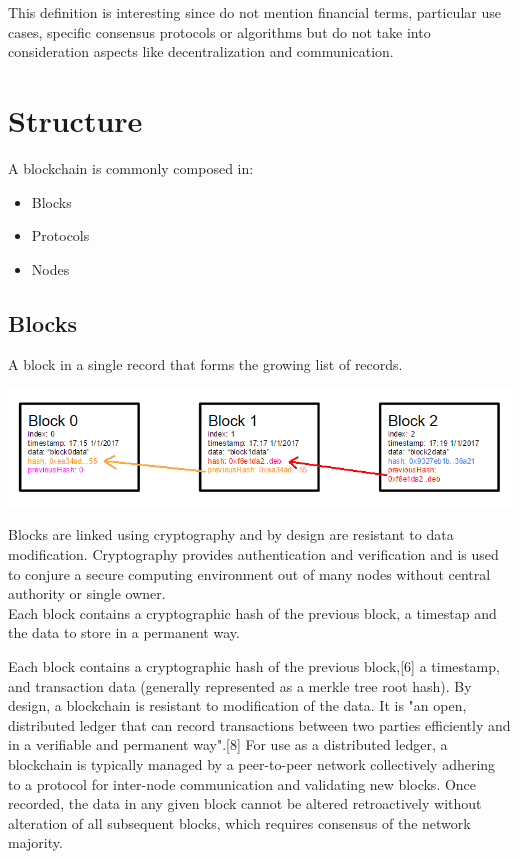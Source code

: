 This definition is interesting since do not mention financial terms, particular use cases, specific consensus protocols or algorithms but do not take into consideration aspects like decentralization and communication.

\section{Structure}

A blockchain is commonly composed in:
\begin{itemize}
    \item Blocks
    \item Protocols
    \item Nodes
\end{itemize}

\subsection{Blocks}

A block in a single record that forms the growing list of records.

\includegraphics[scale=0.45]{images/blockchain_basic.png}

Blocks are linked using cryptography and by design are resistant to data modification. Cryptography provides authentication and verification and is used to conjure a secure computing environment out of many nodes without central authority or single owner.\\
Each block contains a cryptographic hash of the previous block, a timestap and the data to store in a permanent way.

Each block contains a cryptographic hash of the previous block,[6] a timestamp, and transaction data (generally represented as a merkle tree root hash). By design, a blockchain is resistant to modification of the data. It is "an open, distributed ledger that can record transactions between two parties efficiently and in a verifiable and permanent way".[8] For use as a distributed ledger, a blockchain is typically managed by a peer-to-peer network collectively adhering to a protocol for inter-node communication and validating new blocks. Once recorded, the data in any given block cannot be altered retroactively without alteration of all subsequent blocks, which requires consensus of the network majority.

